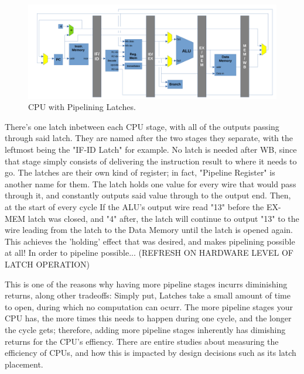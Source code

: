 \documentclass[12pt,twoside]{reedthesis}
\begin{document}
\begin{figure}[h!]

	\centering
	\includegraphics[scale=0.4]{cpu_latches}
	\caption{CPU with Pipelining Latches.}
	\label{cpu-latches}
\end{figure}

There's one latch inbetween each CPU stage, with all of the outputs passing through said latch. They are named after the two stages they separate, with the leftmost being the "IF-ID Latch" for example. No latch is needed after WB, since that stage simply consists of delivering the instruction result to where it needs to go.
The latches are their own kind of register; in fact, "Pipeline Register" is another name for them. The latch holds one value for every wire that would pass through it, and constantly outputs said value through to the output end. Then, at the start of every cycle If the ALU's output wire read "13" before the EX-MEM latch was closed, and "4" after, the latch will continue to output "13" to the wire leading from the latch to the Data Memory until the latch is opened again. This achieves the 'holding' effect that was desired, and makes pipelining possible at all! In order to pipeline possible... (REFRESH ON HARDWARE LEVEL OF LATCH OPERATION)

This is one of the reasons why having more pipeline stages incurrs diminishing returns, along other tradeoffs: Simply put, Latches take a small amount of time to open, during which no computation can ocurr. The more pipeline stages your CPU has, the more times this needs to happen during one cycle, and the longer the cycle gets; therefore, adding more pipeline stages inherently has dimishing returns for the CPU's effiency. There are entire studies about measuring the efficiency of CPUs, and how this is impacted by design decisions such as its latch placement.
\end{document}
